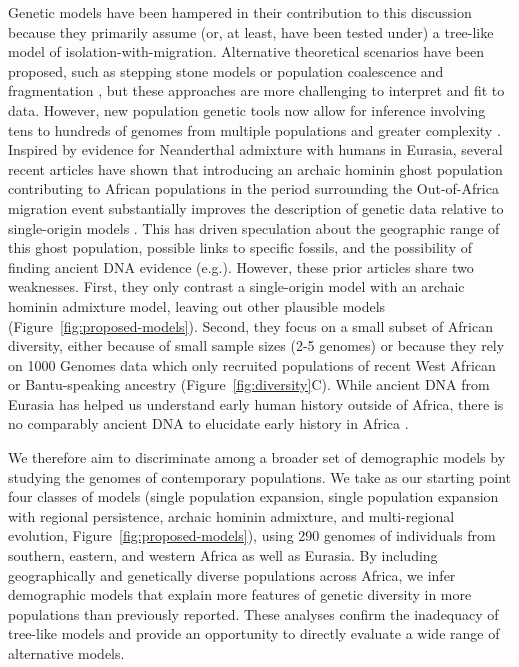 \documentclass[]{article}
\begin{document}
Genetic models have been hampered in their contribution to this discussion
because they primarily assume (or, at least, have been tested under) a
tree-like model of isolation-with-migration. Alternative theoretical scenarios
have been proposed, such as stepping stone models \citep{Arredondo2021-qa} or
population coalescence and fragmentation \citep{Scerri2019-xg}, but these
approaches are more challenging to interpret and fit to data.
However, new population genetic tools now allow for inference involving tens to
hundreds of genomes from multiple populations and greater complexity
\citep{Kamm2020-vn,Ragsdale2019-nt,Speidel2019-nj}. Inspired by evidence for
Neanderthal admixture with humans in Eurasia, several recent articles
have shown that introducing an archaic hominin ghost population contributing to African
populations in the period surrounding the Out-of-Africa migration event
substantially improves the description of genetic data relative to
single-origin models
\citep{Plagnol2006-lt,Hammer2011-bx,Hsieh2016-gk,Hey2018-pw,Ragsdale2019-nt,Lorente-Galdos2019-vz,Durvasula2020-td}.
This has driven speculation about the geographic range of this ghost
population, possible links to specific fossils, and the possibility of
finding ancient DNA evidence (e.g.\citep{Hsieh2016-gk}). However, these prior
articles share two weaknesses. First, they only contrast a single-origin model
with an archaic hominin admixture model, leaving out other plausible models
\citep{Henn2018-rf} (Figure~\ref{fig:proposed-models}).
Second, they
focus on a small subset of African diversity, either because of small sample
sizes (2-5 genomes) or because they rely on 1000 Genomes data which only
recruited populations of recent West African or Bantu-speaking ancestry
(Figure~\ref{fig:diversity}C). 
While ancient DNA from Eurasia has helped us understand early human history
outside of Africa, there is no comparably ancient DNA to elucidate early history
in Africa \citep{Lipson2022-xf}.

We therefore aim to discriminate among a broader set of demographic
models by studying the genomes of contemporary populations. We take as our
starting point four classes of models (single population expansion, single
population expansion with regional persistence, archaic hominin admixture, and
multi-regional evolution, Figure~\ref{fig:proposed-models}), using 290
genomes of individuals from southern, eastern, and western Africa as well as Eurasia. By
including geographically and genetically diverse populations across Africa, we
infer demographic models that explain more features of genetic diversity
in more
populations than previously reported. These analyses confirm the inadequacy of
tree-like models and provide an opportunity to directly evaluate a wide range
of alternative models. 
\end{document}
